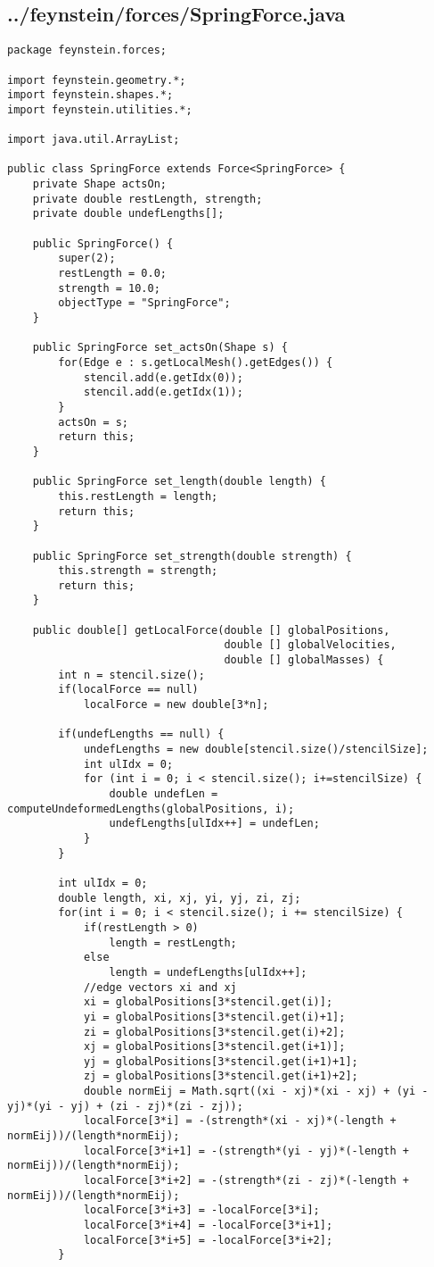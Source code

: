 \subsection*{../feynstein/forces/SpringForce.java}
\begin{lstlisting}
package feynstein.forces;

import feynstein.geometry.*;
import feynstein.shapes.*;
import feynstein.utilities.*;

import java.util.ArrayList;

public class SpringForce extends Force<SpringForce> {
    private Shape actsOn;
    private double restLength, strength;
	private double undefLengths[];
	
    public SpringForce() {
		super(2);
		restLength = 0.0;
		strength = 10.0;
		objectType = "SpringForce";
    }

    public SpringForce set_actsOn(Shape s) {
		for(Edge e : s.getLocalMesh().getEdges()) {
			stencil.add(e.getIdx(0));
			stencil.add(e.getIdx(1));
		}
		actsOn = s;
		return this;
    }

    public SpringForce set_length(double length) {
		this.restLength = length;
		return this;
    }

    public SpringForce set_strength(double strength) {
		this.strength = strength;
		return this;
    }
	
	public double[] getLocalForce(double [] globalPositions,
								  double [] globalVelocities,
								  double [] globalMasses) {
		int n = stencil.size();
		if(localForce == null)
			localForce = new double[3*n];
		
		if(undefLengths == null) {
			undefLengths = new double[stencil.size()/stencilSize];
			int ulIdx = 0;
			for (int i = 0; i < stencil.size(); i+=stencilSize) {
				double undefLen = computeUndeformedLengths(globalPositions, i);
				undefLengths[ulIdx++] = undefLen;
			}
		}
		
		int ulIdx = 0;
		double length, xi, xj, yi, yj, zi, zj;
		for(int i = 0; i < stencil.size(); i += stencilSize) {
			if(restLength > 0)
				length = restLength;
			else 
				length = undefLengths[ulIdx++];
			//edge vectors xi and xj
			xi = globalPositions[3*stencil.get(i)];
			yi = globalPositions[3*stencil.get(i)+1];
			zi = globalPositions[3*stencil.get(i)+2];
			xj = globalPositions[3*stencil.get(i+1)];
			yj = globalPositions[3*stencil.get(i+1)+1];
			zj = globalPositions[3*stencil.get(i+1)+2];
			double normEij = Math.sqrt((xi - xj)*(xi - xj) + (yi - yj)*(yi - yj) + (zi - zj)*(zi - zj));
			localForce[3*i] = -(strength*(xi - xj)*(-length + normEij))/(length*normEij);
			localForce[3*i+1] = -(strength*(yi - yj)*(-length + normEij))/(length*normEij);
			localForce[3*i+2] = -(strength*(zi - zj)*(-length + normEij))/(length*normEij);
			localForce[3*i+3] = -localForce[3*i];
			localForce[3*i+4] = -localForce[3*i+1];
			localForce[3*i+5] = -localForce[3*i+2];
		}
		

\end{lstlisting}
